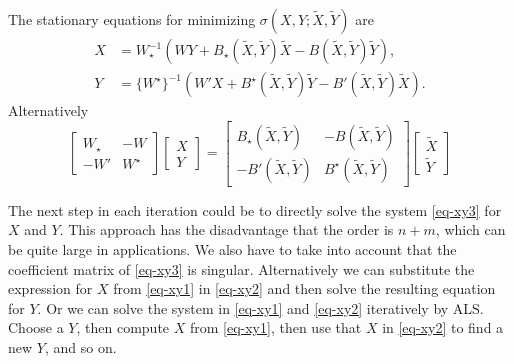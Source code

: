 \documentclass[
  12pt,
  letterpaper,
  DIV=11,
  numbers=noendperiod]{scrartcl}
\begin{document}
The stationary equations for minimizing
\(\sigma(X,Y;\tilde X, \tilde Y)\) are \begin{subequations}
  \begin{align}
    X & = W_\star^{-1}(WY + B_\star(\tilde X,\tilde Y)\tilde X - B(\tilde X,\tilde Y)\tilde Y),\label{eq-xy1}        \\
    Y & = \{W^\star\}^{-1}(W'X + B^\star(\tilde X,\tilde Y)\tilde Y - B'(\tilde X, \tilde Y)\tilde X).\label{eq-xy2}
  \end{align}
\end{subequations} Alternatively \begin{equation}
  \begin{bmatrix}
    W_\star & -W      \\
    -W'     & W^\star
  \end{bmatrix}
  \begin{bmatrix}
    X \\
    Y
  \end{bmatrix} =
  \begin{bmatrix}
    B_\star(\tilde X,\tilde Y) & -B(\tilde X,\tilde Y)      \\
    -B'(\tilde X, \tilde Y)    & B^\star(\tilde X,\tilde Y)
  \end{bmatrix}
  \begin{bmatrix}
    \tilde X \\
    \tilde Y
  \end{bmatrix}\label{eq-xy3}
\end{equation}

The next step in each iteration could be to directly solve the system
\eqref{eq-xy3} for \(X\) and \(Y\). This approach has the disadvantage
that the order is \(n + m\), which can be quite large in applications.
We also have to take into account that the coefficient matrix of
\eqref{eq-xy3} is singular. Alternatively we can substitute the
expression for \(X\) from \eqref{eq-xy1} in \eqref{eq-xy2} and then
solve the resulting equation for \(Y\). Or we can solve the system in
\eqref{eq-xy1} and \eqref{eq-xy2} iteratively by ALS. Choose a \(Y\),
then compute \(X\) from \eqref{eq-xy1}, then use that \(X\) in
\eqref{eq-xy2} to find a new \(Y\), and so on.
\end{document}
